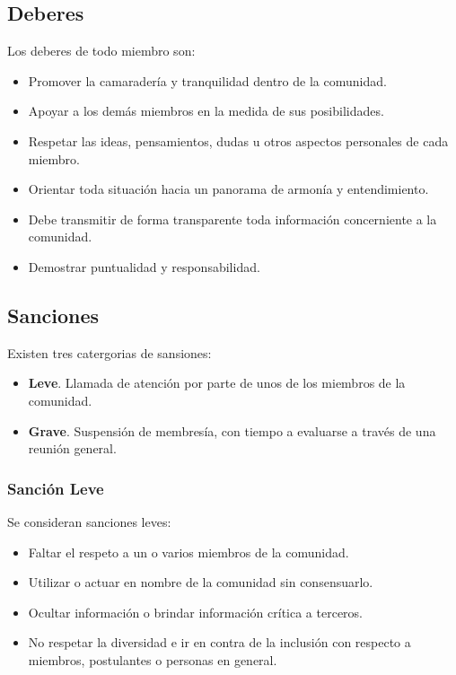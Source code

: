 \documentclass[12pt, letterpaper]{article}
\begin{document}
    \subsection{Deberes}
    Los deberes de todo miembro son:
    \begin{itemize}
        \item Promover la camaradería y tranquilidad dentro de la comunidad.
        \item Apoyar a los demás miembros en la medida de sus posibilidades.
        \item Respetar las ideas, pensamientos, dudas u otros aspectos 
        personales de cada miembro.
        \item Orientar toda situación hacia un panorama de armonía y 
        entendimiento.
        \item Debe transmitir de forma transparente toda información 
        concerniente a la comunidad.
        \item Demostrar puntualidad y responsabilidad.
    \end{itemize}
    
    \subsection{Sanciones}
    Existen tres catergorias de sansiones:
    \begin{itemize}
        \item \textbf{Leve}. Llamada de atención por parte de unos de los
        miembros de la comunidad.
        \item \textbf{Grave}. Suspensión de membresía, con tiempo a evaluarse a 
        través de una reunión general.
    \end{itemize}

    \subsubsection{Sanción Leve}
    Se consideran sanciones leves:
    \begin{itemize}
        \item Faltar el respeto a un o varios miembros de la comunidad.
        \item Utilizar o actuar en nombre de la comunidad sin consensuarlo.
        \item Ocultar información o brindar información crítica a terceros.
        \item No respetar la diversidad e ir en contra de la inclusión con 
        respecto a miembros, postulantes o personas en general.
    \end{itemize}
\end{document}
